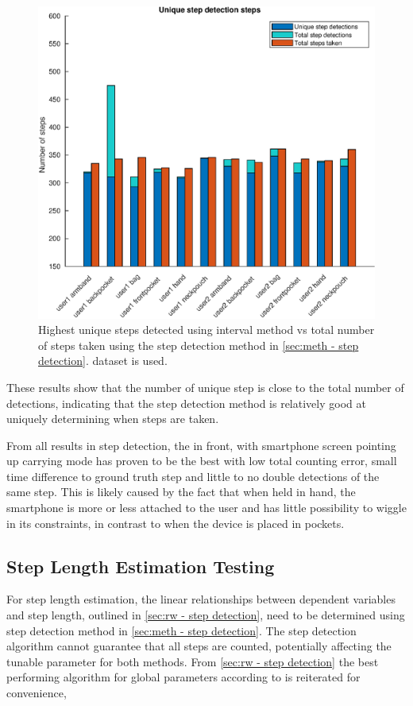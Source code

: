 \begin{figure}[H]
	\centering
	\includegraphics[width=0.7\linewidth]{images/20201127_1626_Unique_step_detection_steps}
	\setlength{\belowcaptionskip}{-10pt}
\caption[False positives and true positives step detection comparison]{Highest unique steps detected using interval method vs total number of steps taken using the step detection method in \cref{sec:meth - step detection}. \citet{Brajdic2013} dataset is used. }
\label{fig:sd_tp_fp_comparison}
\end{figure}

These results show that the number of unique step is close to the total number of detections, indicating that the step detection method is relatively good at uniquely determining when steps are taken. \par 

From all results in step detection, the in front, with smartphone screen pointing up carrying mode has proven to be the best with low total counting error, small time difference to ground truth step and little to no double detections of the same step. This is likely caused by the fact that when held in hand, the smartphone is more or less attached to the user and has little possibility to wiggle in its constraints, in contrast to when the device is placed in pockets. 

\subsection{Step Length Estimation Testing}
\label{sec:results-step_length_estimation}
For step length estimation, the linear relationships between dependent variables and step length, outlined in \cref{sec:rw - step detection}, need to be determined using step detection method in \cref{sec:meth - step detection}. The step detection algorithm cannot guarantee that all steps are counted, potentially affecting the tunable parameter for both methods.  From \cref{sec:rw - step detection} the best performing algorithm for global parameters according to \cite{Vezocnik2019} is reiterated for convenience,

